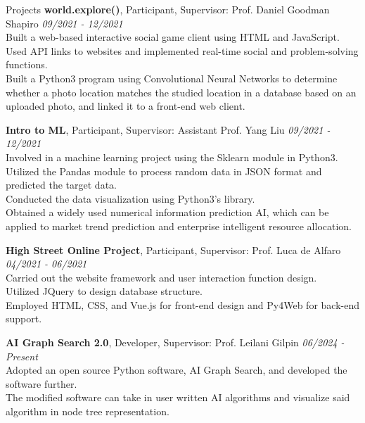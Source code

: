 \documentclass{resume} %
\begin{document}
\begin{rSection}{Projects}
{\bf world.explore()}{, Participant, Supervisor: Prof. Daniel Goodman Shapiro} \hfill {\em 09/2021 - 12/2021}\\
Built a web-based interactive social game client using HTML and JavaScript.\\
Used API links to websites and implemented real-time social and problem-solving functions.\\
Built a Python3 program using Convolutional Neural Networks to determine whether a photo location matches the
studied location in a database based on an uploaded photo, and linked it to a front-end web client.

{\bf Intro to ML}{, Participant, Supervisor: Assistant Prof. Yang Liu} \hfill {\em 09/2021 - 12/2021}\\
Involved in a machine learning project using the Sklearn module in Python3. \\
Utilized the Pandas module to process random data in JSON format and predicted the target data. \\
Conducted the data visualization using Python3’s library. \\
Obtained a widely used numerical information prediction AI, which can be applied to market trend prediction and
enterprise intelligent resource allocation. 

{\bf High Street Online Project}{, Participant, Supervisor: Prof. Luca de Alfaro} \hfill {\em 04/2021 - 06/2021}\\
Carried out the website framework and user interaction function design. \\
Utilized JQuery to design database structure. \\
Employed HTML, CSS, and Vue.js for front-end design and Py4Web for back-end support. 

{\bf AI Graph Search 2.0}{, Developer, Supervisor: Prof. Leilani Gilpin} \hfill {\em 06/2024 - Present}\\
Adopted an open source Python software, AI Graph Search, and developed the software further. \\
The modified software can take in user written AI algorithms and visualize said algorithm in
node tree representation. 

\end{rSection}
\end{document}
